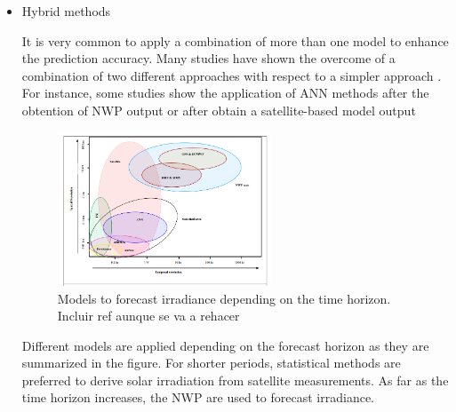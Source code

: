 \begin{itemize}




\item{Hybrid methods}

It is very common to apply a combination of more than one model to enhance the prediction accuracy. Many studies have shown the overcome of a combination of two different approaches with respect to a simpler approach \cite*{Diagne2017, Yang2014}. For instance, some studies show the application of ANN methods after the obtention of NWP output \cite*{Cornaro2015} or after obtain a satellite-based model output \cite*{Marquez2013} 

\begin{figure}[h!]
\centering\includegraphics[width=0.6\textwidth]{figs/forecast.png}
\caption{Models to forecast irradiance depending on the time horizon. Incluir ref aunque se va a rehacer}
\label{fig:forecast}
\end{figure}


Different models are applied depending on the forecast horizon as they are summarized in the figure. For shorter periods, statistical methods are preferred to derive solar irradiation from satellite measurements. As far as the time horizon increases, the NWP are used to forecast irradiance.


\end{itemize}


